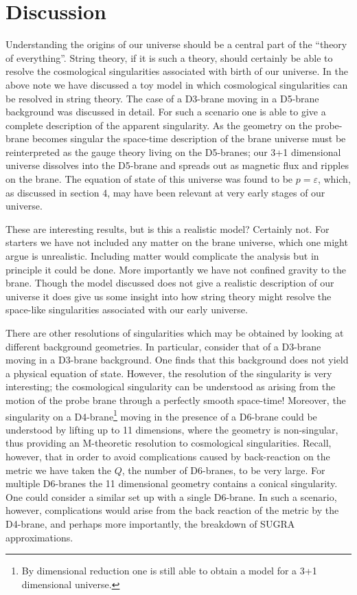 \documentclass[a4paper,12pt]{article}
\newcommand{\ed}{\varepsilon}
\begin{document}
\section{Discussion}
%
%

Understanding the origins of our universe should be a central part of the
``theory of everything''.  String theory, 
if it is such a theory, should certainly be able to resolve the cosmological
singularities associated with birth of our universe. 
In the above note we have discussed a toy model in which cosmological
singularities can be resolved in string theory.  The case of a
D3-brane moving in a
D5-brane background was discussed in detail.  For such a scenario one
is able to give a complete description of the apparent singularity.  As the
geometry on the probe-brane becomes
singular the space-time description of the brane universe must be
reinterpreted as the gauge theory
living on the D5-branes;  our 3+1 dimensional universe dissolves into the
D5-brane and spreads out as magnetic flux and ripples on the brane.  
The equation of state of this universe was found to be $p = \ed$, 
which, as discussed in
section 4, may have been relevant at very early stages of our universe.  

These are interesting results, but is this a realistic model?
Certainly not.  For starters we have not included any matter on the
brane universe, which one might argue is unrealistic.  Including
matter would complicate the analysis but in
principle it could be done.  More importantly we have not confined
gravity to the brane.  Though the model discussed does not give a
realistic description of our
universe it does give us some insight into how string theory might
resolve the space-like singularities associated with our early universe.

There are other resolutions of singularities which may be obtained by looking at
different background geometries.
In particular, consider that of a D3-brane moving in a D3-brane background.
One finds that this background does not yield a physical equation
of state.  However, the resolution of the singularity is 
very interesting;   
the cosmological singularity can be understood as arising from the motion
of the probe brane through a perfectly smooth space-time!  
Moreover, the singularity on a D4-brane\footnote{By  dimensional
reduction one is still able to obtain a model for a 3+1 dimensional universe.}
moving in the presence of a D6-brane could be understood by lifting up to 11
dimensions, where the geometry is non-singular, thus providing an
M-theoretic resolution to cosmological
singularities.  Recall, however, that in order to avoid complications
caused by back-reaction on the metric we have taken the $Q$, the number
of D6-branes, to be very large.  For multiple D6-branes the 11
dimensional geometry contains a
conical singularity.  One could consider a similar set up with a
single D6-brane.  In such a scenario, however, complications
would arise from the back reaction of the metric by the D4-brane,
and perhaps more importantly, the breakdown of SUGRA
approximations. 
\end{document}
